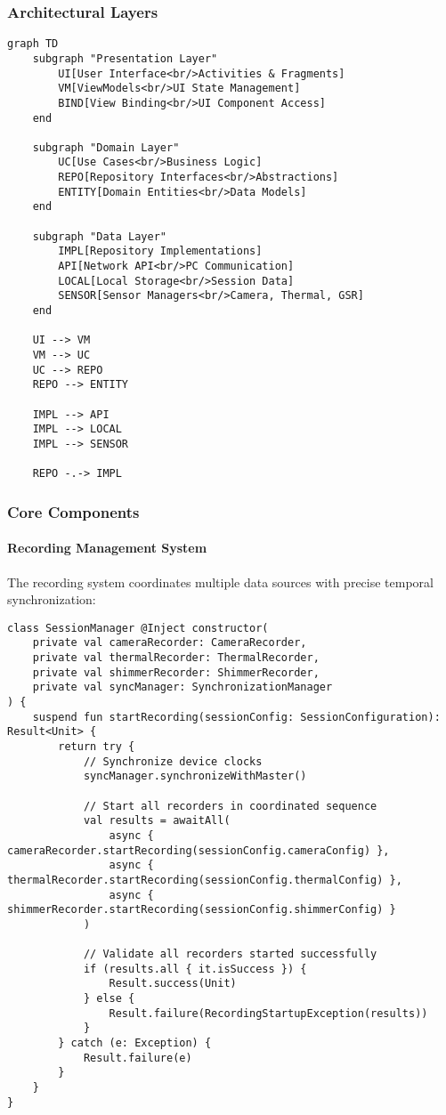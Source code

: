 \documentclass[11pt,a4paper]{report}
\begin{document}
\subsubsection{Architectural Layers}

\begin{verbatim}
graph TD
    subgraph "Presentation Layer"
        UI[User Interface<br/>Activities & Fragments]
        VM[ViewModels<br/>UI State Management]
        BIND[View Binding<br/>UI Component Access]
    end

    subgraph "Domain Layer"
        UC[Use Cases<br/>Business Logic]
        REPO[Repository Interfaces<br/>Abstractions]
        ENTITY[Domain Entities<br/>Data Models]
    end

    subgraph "Data Layer"
        IMPL[Repository Implementations]
        API[Network API<br/>PC Communication]
        LOCAL[Local Storage<br/>Session Data]
        SENSOR[Sensor Managers<br/>Camera, Thermal, GSR]
    end

    UI --> VM
    VM --> UC
    UC --> REPO
    REPO --> ENTITY

    IMPL --> API
    IMPL --> LOCAL
    IMPL --> SENSOR

    REPO -.-> IMPL
\end{verbatim}

\subsubsection{Core Components}

\paragraph{Recording Management System}

The recording system coordinates multiple data sources with precise temporal synchronization:

\begin{verbatim}
class SessionManager @Inject constructor(
    private val cameraRecorder: CameraRecorder,
    private val thermalRecorder: ThermalRecorder,
    private val shimmerRecorder: ShimmerRecorder,
    private val syncManager: SynchronizationManager
) {
    suspend fun startRecording(sessionConfig: SessionConfiguration): Result<Unit> {
        return try {
            // Synchronize device clocks
            syncManager.synchronizeWithMaster()

            // Start all recorders in coordinated sequence
            val results = awaitAll(
                async { cameraRecorder.startRecording(sessionConfig.cameraConfig) },
                async { thermalRecorder.startRecording(sessionConfig.thermalConfig) },
                async { shimmerRecorder.startRecording(sessionConfig.shimmerConfig) }
            )

            // Validate all recorders started successfully
            if (results.all { it.isSuccess }) {
                Result.success(Unit)
            } else {
                Result.failure(RecordingStartupException(results))
            }
        } catch (e: Exception) {
            Result.failure(e)
        }
    }
}
\end{verbatim}
\end{document}
